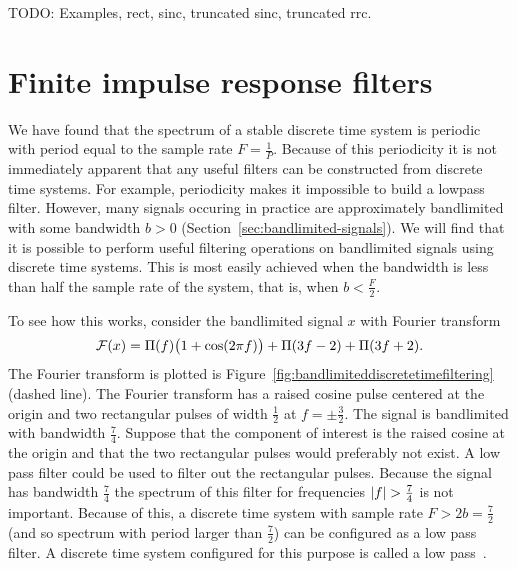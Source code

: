 TODO: Examples, rect, sinc, truncated sinc, truncated rrc. 

\section{Finite impulse response filters}

We have found that the spectrum of a stable discrete time system is periodic with period equal to the sample rate $F = \tfrac{1}{P}$.  Because of this periodicity it is not immediately apparent that any useful filters can be constructed from discrete time systems.  For example, periodicity makes it impossible to build a lowpass filter.  However, many signals occuring in practice are approximately bandlimited with some bandwidth $b > 0$ (Section~\ref{sec:bandlimited-signals}).  We will find that it is possible to perform useful filtering operations on bandlimited signals using discrete time systems.  This is most easily achieved when the bandwidth is less than half the sample rate of the system, that is, when $b < \tfrac{F}{2}$.

To see how this works, consider the bandlimited signal $x$ with Fourier transform
\[
{\mathcal F}(x) = \Pi(f) \big(1 + \cos( 2 \pi f )\big) + \Pi(3f - 2) + \Pi(3f + 2).
\]
The Fourier transform is plotted is Figure~\ref{fig:bandlimiteddiscretetimefiltering} (dashed line).  The Fourier transform has a raised cosine pulse centered at the origin and two rectangular pulses of width $\tfrac{1}{2}$ at $f = \pm \tfrac{3}{2}$.  The signal is bandlimited with bandwidth $\tfrac{7}{4}$.  Suppose that the component of interest is the raised cosine at the origin and that the two rectangular pulses would preferably not exist.  A low pass filter could be used to filter out the rectangular pulses.  Because the signal has bandwidth $\tfrac{7}{4}$ the spectrum of this filter for frequencies $\left\vert f \right\vert > \tfrac{7}{4}$ is not important.  Because of this, a discrete time system with sample rate $F > 2b = \frac{7}{2}$ (and so spectrum with period larger than $\tfrac{7}{2}$) can be configured as a low pass filter.  A discrete time system configured for this purpose is called a low pass~.

